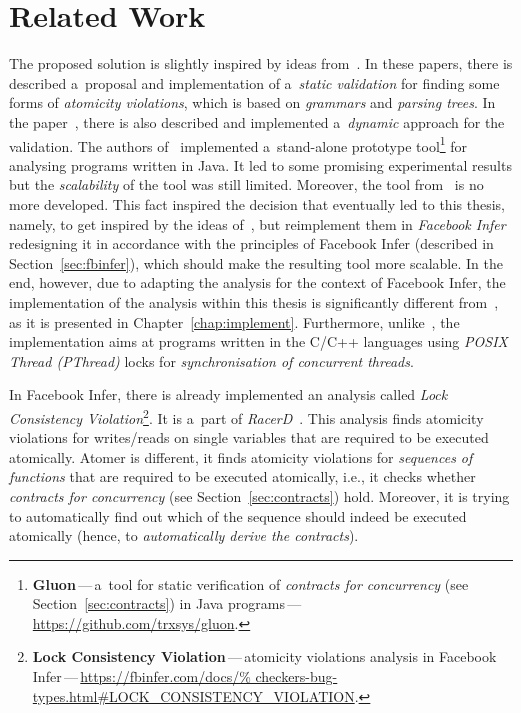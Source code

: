 \section{Related Work}
\label{sec:relWork}

The proposed solution is slightly inspired by ideas from~\cite{contracts2017,
contracts2015}. In these papers, there is described a~proposal and
implementation of a~\emph{static validation} for finding some forms of
\emph{atomicity violations}, which is based on \emph{grammars} and
\emph{parsing trees}. In the paper~\cite{contracts2017}, there is also
described and implemented a~\emph{dynamic} approach for the validation. The
authors of~\cite{contracts2017, contracts2015} implemented a~stand-alone
prototype tool\footnote{\textbf{Gluon}\,---\,a~tool for static verification of
\emph{contracts for concurrency} (see Section~\ref{sec:contracts}) in Java
programs\,---\,\url{https://github.com/trxsys/gluon}.} for analysing programs
written in Java. It led to some promising experimental results but the
\emph{scalability} of the tool was still limited. Moreover, the tool
from~\cite{contracts2017, contracts2015} is no more developed. This
fact inspired the decision that eventually led to this thesis, namely, to
get inspired by the ideas of~\cite{contracts2017, contracts2015}, but
reimplement them in \emph{Facebook Infer} redesigning it in accordance
with the principles of Facebook Infer (described in
Section~\ref{sec:fbinfer}), which should make the resulting tool more
scalable. In the end, however, due to adapting the analysis for the context
of Facebook Infer, the implementation of the analysis within this thesis is
significantly different from~\cite{contracts2017, contracts2015}, as it is
presented in Chapter~\ref{chap:implement}. Furthermore,
unlike~\cite{contracts2017, contracts2015}, the implementation aims at
programs written in the C/C++ languages using \emph{POSIX Thread (PThread)}
locks for \emph{synchronisation of concurrent threads}.

In Facebook Infer, there is already implemented an analysis called
\emph{Lock Consistency Violation}\footnote{\textbf{Lock Consistency
Violation}\,---\,atomicity violations analysis in Facebook
Infer\,---\,\url{https://fbinfer.com/docs/%
checkers-bug-types.html\#LOCK_CONSISTENCY_VIOLATION}.}. It is a~part of
\emph{RacerD}~\cite{racerD, racerDOnline, staticRaceDetectorTruePositive}.
This analysis finds atomicity violations for writes/reads on single
variables that are required to be executed atomically. Atomer is different,
it finds atomicity violations for \emph{sequences of functions} that are
required to be executed atomically, i.e., it checks whether \emph{contracts
for concurrency} (see Section~\ref{sec:contracts}) hold. Moreover, it is
trying to automatically find out which of the sequence should indeed
be executed atomically (hence, to \emph{automatically derive the
contracts}).


